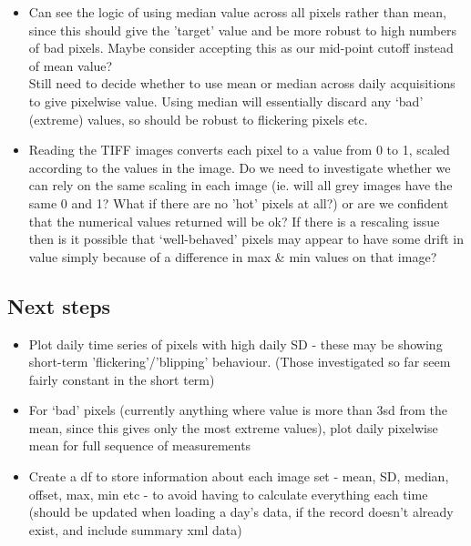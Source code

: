 \documentclass[10pt,fleqn]{article}
\begin{document}
\begin{itemize}
\item
Can see the logic of using median value across all pixels rather than mean, since this should give the 'target' value and be more robust to high numbers of bad pixels. Maybe consider accepting this as our mid-point cutoff instead of mean value? \\
Still need to decide whether to use mean or median across daily acquisitions to give pixelwise value. Using median will essentially discard any `bad' (extreme) values, so should be robust to flickering pixels etc.

\item
Reading the TIFF images converts each pixel to a value from 0 to 1, scaled according to the values in the image. Do we need to investigate whether we can rely on the same scaling in each image (ie. will all grey images have the same 0 and 1? What if there are no 'hot' pixels at all?) or are we confident that the numerical values returned will be ok? If there is a rescaling issue then is it possible that `well-behaved' pixels may appear to have some drift in value simply because of a difference in max \& min values on that image?

\end{itemize}

\subsection*{Next steps}

\begin{itemize}

\item
Plot daily time series of pixels with high daily SD - these may be showing short-term 'flickering'/'blipping' behaviour. (Those investigated so far seem fairly constant in the short term)

\item
For `bad' pixels (currently anything where value is more than 3sd from the mean, since this gives only the most extreme values), plot daily pixelwise mean for full sequence of measurements

\item
Create a df to store information about each image set - mean, SD, median, offset, max, min etc - to avoid having to calculate everything each time (should be updated when loading a day's data, if the record doesn't already exist, and include summary xml data)

\end{itemize}

\end{document}
